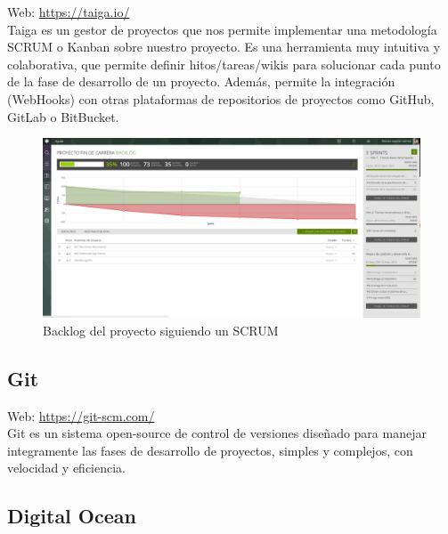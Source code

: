 Web: \url{https://taiga.io/}\\

Taiga es un gestor de proyectos que nos permite implementar una metodología SCRUM o Kanban sobre nuestro proyecto. Es una herramienta muy intuitiva y colaborativa, que permite definir hitos/tareas/wikis para solucionar cada punto de la fase de desarrollo de un proyecto. Además, permite la integración (WebHooks) con otras plataformas de repositorios de proyectos como GitHub, GitLab o BitBucket. \\
\newpage
\begin{figure}[H]
\includegraphics[scale=0.235]{diagramas/taiga-backlog.png}
\caption{Backlog del proyecto siguiendo un SCRUM}
\end{figure}



\subsection{Git}


Web: \url{https://git-scm.com/}\\

Git es un sistema open-source de control de versiones diseñado para manejar integramente las fases de desarrollo de proyectos, simples y complejos, con velocidad y eficiencia.\\

\subsection{Digital Ocean}

